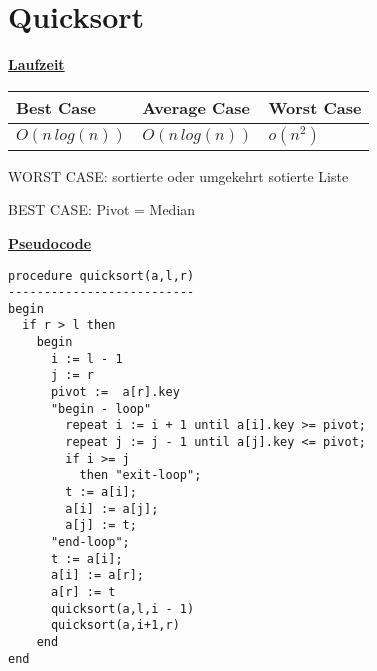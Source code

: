\documentclass[a4paper]{report}
\begin{document}
\chapter*{Quicksort}

\underline{\bf{Laufzeit}}


\begin{tabular}{|l|l|l|}
\hline
Best Case    & Average Case  &  Worst Case\\ \hline
$O(n\,log(n))$ & $O(n\,log(n))$  &  $o(n^2)$  \\ \hline
\end{tabular}


WORST CASE: sortierte oder umgekehrt sotierte Liste



BEST CASE: Pivot = Median

\underline{\bf{Pseudocode}}

\begin{lstlisting}
procedure quicksort(a,l,r)
--------------------------
begin
  if r > l then    
    begin
      i := l - 1
      j := r
      pivot :=  a[r].key
      "begin - loop"
        repeat i := i + 1 until a[i].key >= pivot;
        repeat j := j - 1 until a[j].key <= pivot;
        if i >= j
          then "exit-loop";
        t := a[i];
        a[i] := a[j];
        a[j] := t;
      "end-loop";
      t := a[i];
      a[i] := a[r];
      a[r] := t
      quicksort(a,l,i - 1)
      quicksort(a,i+1,r)
    end
end 
\end{lstlisting}
\end{document}
